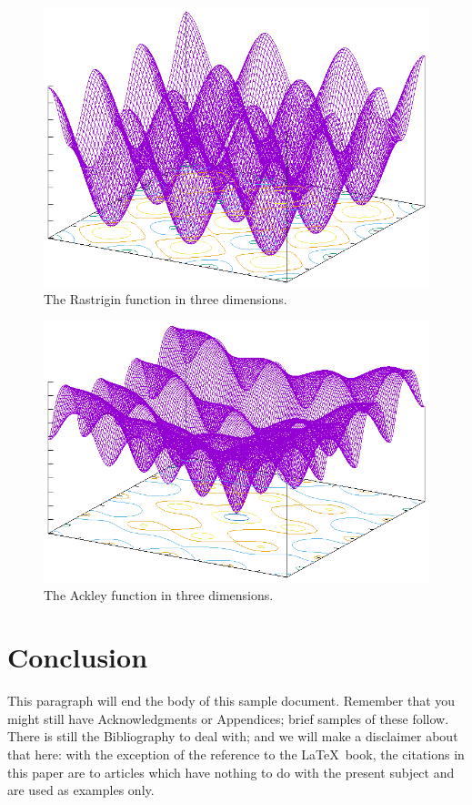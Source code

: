 \begin{figure}
  \includegraphics[width=\columnwidth]{../img/rastrigin}
  \caption{The Rastrigin function in three dimensions.}\label{fig:rastrigin}
\end{figure}

\begin{figure}
  \includegraphics[width=\columnwidth]{../img/ackley}
  \caption{The Ackley function in three dimensions.}\label{fig:ackley}
\end{figure}


\section{Conclusion}
This paragraph will end the body of this sample document.
Remember that you might still have Acknowledgments or
Appendices; brief samples of these
follow.  There is still the Bibliography to deal with; and
we will make a disclaimer about that here: with the exception
of the reference to the \LaTeX\ book, the citations in
this paper are to articles which have nothing to
do with the present subject and are used as
examples only.


